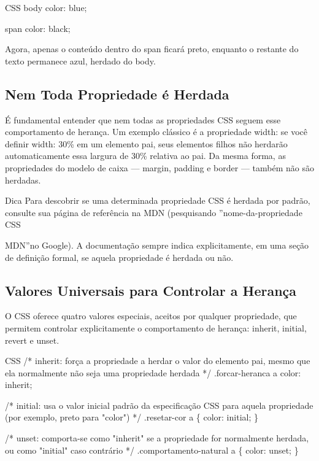 \begin{codebox}{CSS}
 body {
   color: blue;
 }

 span {
   color: black;
 }
\end{codebox}

Agora, apenas o conteúdo dentro do span ficará preto, enquanto o restante do texto permanece azul, herdado do body.

\subsection{Nem Toda Propriedade é Herdada}

É fundamental entender que nem todas as propriedades CSS seguem esse comportamento de herança. Um exemplo clássico é a propriedade width: se você definir width: 30\% em um elemento pai, seus elementos filhos não herdarão automaticamente essa largura de 30\% relativa ao pai. Da mesma forma, as propriedades do modelo de caixa — margin, padding e border — também não são herdadas.

\begin{infobox}{Dica}
Para descobrir se uma determinada propriedade CSS é herdada por padrão, consulte sua página de referência na MDN (pesquisando ”nome-da-propriedade CSS
\end{infobox}

MDN”no Google). A documentação sempre indica explicitamente, em uma seção de definição formal, se aquela propriedade é herdada ou não.

\subsection{Valores Universais para Controlar a Herança}

O CSS oferece quatro valores especiais, aceitos por qualquer propriedade, que permitem controlar explicitamente o comportamento de herança: inherit, initial, revert e unset.

\begin{codebox}{CSS}
/* inherit: força a propriedade a herdar o valor do elemento pai,
   mesmo que ela normalmente não seja uma propriedade herdada */
.forcar-heranca a {
  color: inherit;
}
\end{codebox}

/* initial: usa o valor inicial padrão da especificação CSS para aquela propriedade (por exemplo, preto para "color") */ .resetar-cor a \{ color: initial; \}

/* unset: comporta-se como "inherit" se a propriedade for normalmente herdada, ou como "initial" caso contrário */ .comportamento-natural a \{ color: unset; \}

